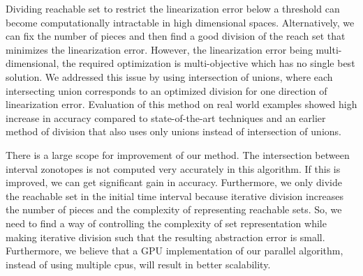 Dividing reachable set to restrict the linearization error below a
threshold can become computationally intractable in high dimensional
spaces.  Alternatively, we can fix the number of pieces and then find
a good division of the reach set that minimizes the linearization
error.  However, the linearization error being multi-dimensional, the
required optimization is multi-objective which has no single best
solution.  We addressed this issue by using intersection of unions,
where each intersecting union corresponds to an optimized division for
one direction of linearization error.  Evaluation of this method on
real world examples showed high increase in accuracy compared to
state-of-the-art techniques and an earlier method of division that
also uses only unions instead of intersection of unions.

There is a large scope for improvement of our method.  The
intersection between interval zonotopes is not computed very
accurately in this algorithm.  If this is improved, we can get
significant gain in accuracy.  Furthermore, we only divide the
reachable set in the initial time interval because iterative division
increases the number of pieces and the complexity of representing
reachable sets.  So, we need to find a way of controlling the
complexity of set representation while making iterative division such
that the resulting abstraction error is small.  Furthermore, we
believe that a GPU implementation of our parallel algorithm,
instead of using multiple cpus, will result in better scalability.
